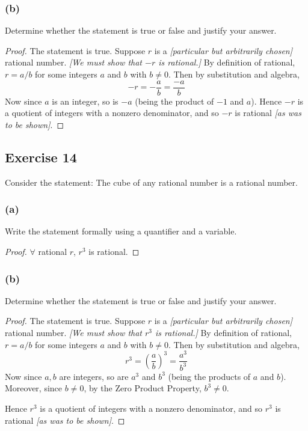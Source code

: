 \documentclass[14pt]{extarticle}
\newcommand{\fa}{\forall}
\begin{document}
\subsubsection{(b)}
Determine whether the statement is true or false and justify your answer.

\begin{proof}
    The statement is true. Suppose $r$ is a {\it [particular but arbitrarily chosen]} rational number. {\it [We must show that $-r$ is rational.]} By definition of rational, $r = a/b$ for some integers $a$ and $b$ with $b \neq 0$. Then by substitution and algebra,
    \[
        -r = -\frac{a}{b} = \frac{-a}{b}
    \]
    Now since $a$ is an integer, so is $-a$ (being the product of $-1$ and $a$). Hence $-r$ is a quotient of integers with a nonzero denominator, and so $-r$ is rational {\it [as was to be shown]}.
\end{proof}

\subsection{Exercise 14}
Consider the statement: The cube of any rational number is a rational number.

\subsubsection{(a)}
Write the statement formally using a quantifier and a variable.

\begin{proof}
    $\fa$ rational $r$, $r^3$ is rational.
\end{proof}

\subsubsection{(b)}
Determine whether the statement is true or false and justify your answer.

\begin{proof}
    The statement is true. Suppose $r$ is a {\it [particular but arbitrarily chosen]} rational number. {\it [We must show that $r^3$ is rational.]} By definition of rational, $r = a/b$ for some integers $a$ and $b$ with $b \neq 0$. Then by substitution and algebra,
    \[
        r^3 = \left(\frac{a}{b}\right)^3 = \frac{a^3}{b^3}
    \]
    Now since $a, b$ are integers, so are $a^3$ and $b^3$ (being the products of $a$ and $b$). Moreover, since $b \neq 0$, by the Zero Product Property, $b^3 \neq 0$.

    Hence $r^3$ is a quotient of integers with a nonzero denominator, and so $r^3$ is rational {\it [as was to be shown]}.
\end{proof}
\end{document}
